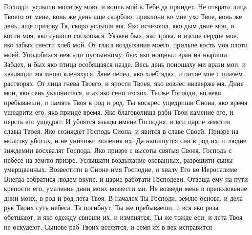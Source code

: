 

Господи, услыши молитву мою, и вопль мой к Тебе да приидет. Не отврати лица Твоего от мене, вонь же день аще скорблю, приклони ко мне ухо Твое, вонь же день, аще призову Тя, скоро услыши мя. Яко исчезоша, яко дым дние мои, и кости моя, яко сушило сосхошася. Уязвен бых, яко трава, и изсше сердце мое, яко забых снести хлеб мой. От гласа воздыхания моего, прильпе кость моя плоти моей. Уподобихся неясыти пустынному, бых яко нощныи вран на нырищи. Забдех, и бых яко птица особящаяся назде. Весь день поношаху ми врази мои, и хвалящии мя мною кленяхуся. Зане пепел, яко хлеб ядях, и питие мое с плачем растворях. От лица гнева Твоего, и ярости Твоея, яко вознес низверже мя. Дние мои, яко сень уклонишася, и аз яко сено изсхох. Ты же Господи, во веки пребываеши, и память Твоя в род и род. Ты воскрес ущедриши Сиона, яко время ушедрити его, яко прииде время. Яко благоволиша раби Твои камение его, и персть его ущедрят. И убоятся языцы имене Господня, и вси царие земстии славы Твоея. Яко созиждет Господь Сиона, и явится в славе Своей. Призре на молитву убогих, и не уничижи моления их. Да напишутся сии в род их, и людие зиждемии восхвалят Господа. Яко призре с высоты святыя Своея, Господь с небесе на землю призре. Услышати воздыхание окованных, разрешити сыны умерщвенных. Возвестити в Сионе имя Господне, и хвалу Его во Иеросалиме. Внегда собратися людем вкупе, и царие работати Господеви. Отвеща ему на пути крепости его, умаление днии моих возвести ми. Не возведи мене в преполовение днии моих, в род и род лета Твоя. В началех Ты Господи, землю основа, и дела рук Твоих суть небеса. Та погибнут, Ты же пребываеши, и вся яко риза обетшают, и яко одежду свиеши их, и изменятся. Ты же тожде еси, и лета Твоя не оскудеют. Сынове раб Твоих вселятся, и семя их в век исправится



